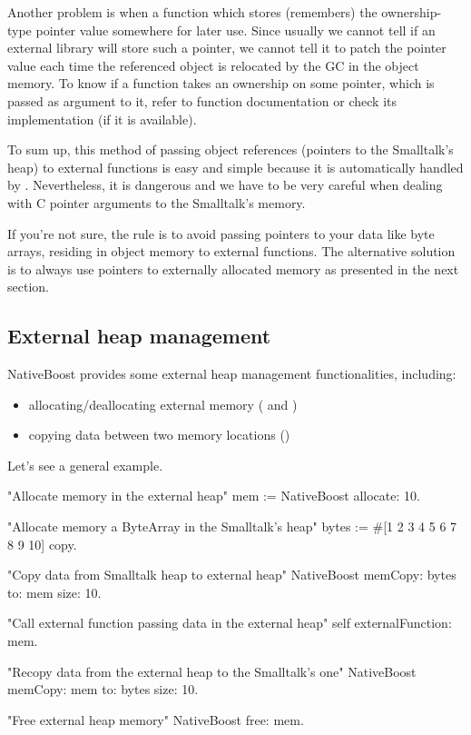 \documentclass[a4paper,10pt,twoside]{book}
\begin{document}
Another problem is when a function which stores (remembers) the ownership-type pointer value somewhere for later use. Since usually we cannot tell if an external library will store such a pointer, we cannot tell it to patch the pointer value each time the referenced object is relocated by the GC in the object memory.
To know if a function takes an ownership on some pointer, which is passed as argument to it, refer to function documentation or check its implementation (if it is available). 

To sum up, this method of passing object references (pointers to the Smalltalk's heap) to external functions is easy and simple because it is automatically handled by \NativeBoost.
Nevertheless, it is dangerous and we have to be very careful when dealing with C pointer arguments to the Smalltalk's memory. 

If you're not sure, the rule is to avoid passing pointers to your data like byte arrays, residing in object memory to external functions.
The alternative solution is to always use pointers to externally allocated memory as presented in the next section.

\subsection{External heap management} %


NativeBoost provides some external heap management functionalities, including: 

\begin{itemize}
	\item allocating/deallocating external memory ( and )
	\item copying data between two memory locations ()
\end{itemize}


Let's see a general example.

\begin{code}{}	
"Allocate memory in the external heap"
mem := NativeBoost allocate: 10.

"Allocate memory a ByteArray in the Smalltalk's heap"
bytes := #[1 2 3 4 5 6 7 8 9 10] copy.

"Copy data from Smalltalk heap to external heap"
NativeBoost memCopy: bytes to: mem  size: 10. 	

"Call external function passing data in the external heap"
self externalFunction: mem.

"Recopy data from the external heap to the Smalltalk's one"
NativeBoost memCopy: mem to: bytes size: 10. 	

"Free external heap memory"
NativeBoost free: mem.
\end{code}
\end{document}
